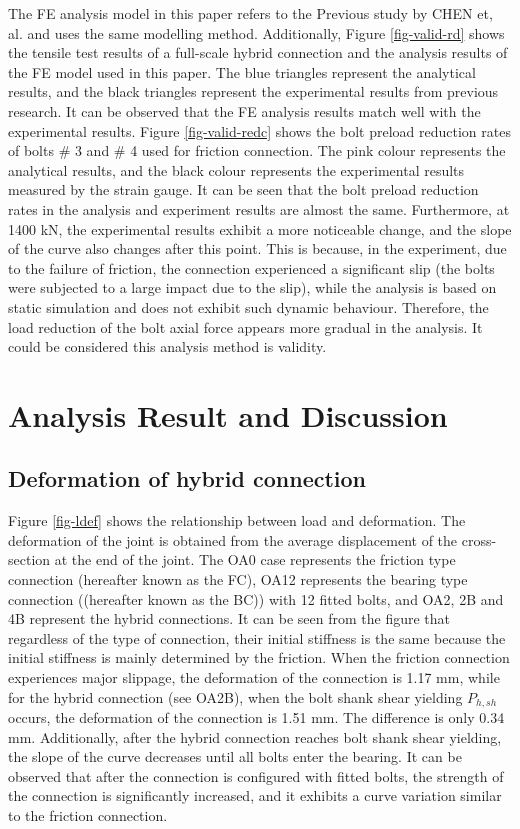 The FE analysis model in this paper refers to the Previous study by CHEN et, al. \cite{chen2023mecha} and uses the same modelling method. Additionally, Figure \ref{fig-valid-rd} shows the tensile test results of a full-scale hybrid connection \cite{chen2024Exp} and the analysis results of the FE model used in this paper. The blue triangles represent the analytical results, and the black triangles represent the experimental results from previous research. It can be observed that the FE analysis results match well with the experimental results. Figure \ref{fig-valid-redc} shows the bolt preload reduction rates of bolts \# 3 and \# 4 used for friction connection. The pink colour represents the analytical results, and the black colour represents the experimental results measured by the strain gauge. It can be seen that the bolt preload reduction rates in the analysis and experiment results are almost the same. Furthermore, at 1400 kN, the experimental results exhibit a more noticeable change, and the slope of the curve also changes after this point. This is because, in the experiment, due to the failure of friction, the connection experienced a significant slip (the bolts were subjected to a large impact due to the slip), while the analysis is based on static simulation and does not exhibit such dynamic behaviour. Therefore, the load reduction of the bolt axial force appears more gradual in the analysis. It could be considered this analysis method is validity. 

\section{Analysis Result and Discussion}



\subsection{Deformation of hybrid connection}

Figure \ref{fig-ldef} shows the relationship between load and deformation. The deformation of the joint is obtained from the average displacement of the cross-section at the end of the joint. The OA0 case represents the friction type connection (hereafter known as the FC), OA12 represents the bearing type connection ((hereafter known as the BC)) with 12 fitted bolts, and OA2, 2B and 4B represent the hybrid connections. It can be seen from the figure that regardless of the type of connection, their initial stiffness is the same because the initial stiffness is mainly determined by the friction. When the friction connection experiences major slippage, the deformation of the connection is 1.17 mm, while for the hybrid connection (see OA2B), when the bolt shank shear yielding $P_{h,sh}$ occurs, the deformation of the connection is 1.51 mm. The difference is only 0.34 mm. Additionally, after the hybrid connection reaches bolt shank shear yielding, the slope of the curve decreases until all bolts enter the bearing. It can be observed that after the connection is configured with fitted bolts, the strength of the connection is significantly increased, and it exhibits a curve variation similar to the friction connection.

